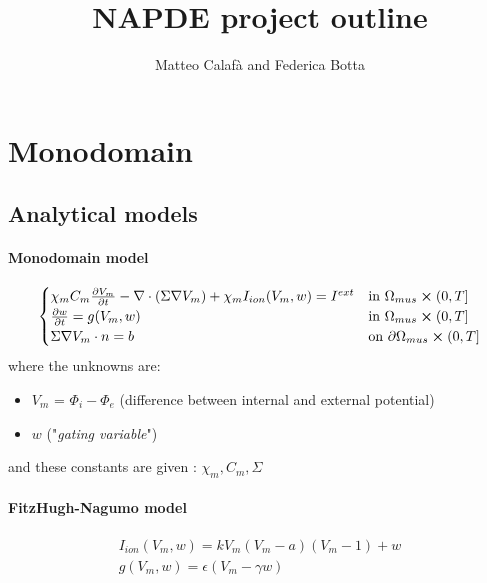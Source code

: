 \documentclass[a4paper]{article}
\begin{document}
\title{NAPDE project outline}
\author{Matteo Calafà and Federica Botta}
\maketitle
\vspace{20mm}
\tableofcontents
\newpage


\section{Monodomain}
\vspace{5mm}
\subsection{Analytical models}
\vspace{5mm}
\paragraph{Monodomain model}
	\begin{equation}
	\begin{cases}
	\chi_m C_m\pdv{V_m}{t} - \nabla \cdot (\Sigma \nabla V_m) + \chi_m I_{ion}(V_m,w) = I^{ext}    & \text{in } \Omega_{mus} \cross (0,T]
	\\
	\pdv{w}{t} = g(V_m, w)  & \text{in } \Omega_{mus} \cross (0,T]
	\\
	\Sigma\nabla V_m \cdot n = b   & \text{on } \partial \Omega_{mus} \cross (0,T]
	\end{cases}
	\end{equation}
	\vspace{4mm}\newline
	where the unknowns are:
	\begin{itemize}
		\item $V_m$ = $\Phi_i - \Phi_e$ (difference between internal and external potential)
		\item $w$  ("\emph{gating variable}")
	\end{itemize}
    and these constants are given : $\chi_m, C_m, \Sigma$



\paragraph{FitzHugh-Nagumo model}
\begin{equation}
\begin{gathered}
I_{ion}(V_m, w) = kV_m(V_m-a)(V_m-1) + w
\\
g(V_m,w) = \epsilon(V_m -\gamma w)
\end{gathered}
\end{equation}
\end{document}
